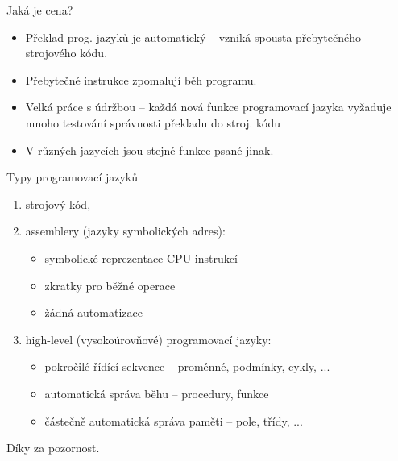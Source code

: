 \documentclass[aspectratio=169,11pt]{beamer}
\begin{document}
\begin{frame}{Jaká je cena?}
 \begin{itemize}
  \item<1-> Překlad prog. jazyků je automatický -- vzniká spousta přebytečného
   strojového kódu.
  \item<2-> Přebytečné instrukce zpomalují běh programu.
  \item<3-> Velká práce s údržbou -- každá nová funkce programovací jazyka
   vyžaduje mnoho testování správnosti překladu do stroj. kódu
  \item<4-> V různých jazycích jsou stejné funkce psané jinak.
 \end{itemize}
\end{frame}

\begin{frame}{Typy programovací jazyků}
 \begin{enumerate}[label=(\arabic*)]
  \item<1-> strojový kód,
  \item<2-> assemblery (jazyky symbolických adres):
   \begin{itemize}
    \item symbolické reprezentace CPU instrukcí
    \item zkratky pro běžné operace
    \item žádná automatizace
   \end{itemize}
  \item<3-> high-level (vysokoúrovňové) programovací jazyky:
   \begin{itemize}
    \item pokročilé řídící sekvence -- proměnné, podmínky, cykly, ...
    \item automatická správa běhu -- procedury, funkce
    \item částečně automatická správa paměti -- pole, třídy, ...
   \end{itemize}
 \end{enumerate}
\end{frame}

\begin{frame}[plain]
 \centering\Huge Díky za pozornost.
\end{frame}
\end{document}

